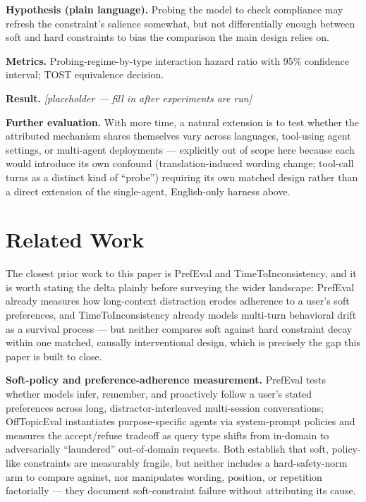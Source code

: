 \documentclass[11pt]{article}
\newcommand{\ph}{\textit{[placeholder --- fill in after experiments are run]}}
\begin{document}
\textbf{Hypothesis (plain language).} Probing the model to check compliance may refresh the constraint's salience somewhat, but not differentially enough between soft and hard constraints to bias the comparison the main design relies on.

\textbf{Metrics.} Probing-regime-by-type interaction hazard ratio with 95\% confidence interval; TOST equivalence decision.

\textbf{Result.} \ph

\vspace{0.5em}
\noindent\textbf{Further evaluation.} With more time, a natural extension is to test whether the attributed mechanism shares themselves vary across languages, tool-using agent settings, or multi-agent deployments --- explicitly out of scope here because each would introduce its own confound (translation-induced wording change; tool-call turns as a distinct kind of ``probe'') requiring its own matched design rather than a direct extension of the single-agent, English-only harness above.

\section{Related Work}

The closest prior work to this paper is PrefEval and TimeToInconsistency, and it is worth stating the delta plainly before surveying the wider landscape: PrefEval already measures how long-context distraction erodes adherence to a user's soft preferences, and TimeToInconsistency already models multi-turn behavioral drift as a survival process --- but neither compares soft against hard constraint decay within one matched, causally interventional design, which is precisely the gap this paper is built to close.

\textbf{Soft-policy and preference-adherence measurement.} PrefEval tests whether models infer, remember, and proactively follow a user's stated preferences across long, distractor-interleaved multi-session conversations; OffTopicEval instantiates purpose-specific agents via system-prompt policies and measures the accept/refuse tradeoff as query type shifts from in-domain to adversarially ``laundered'' out-of-domain requests. Both establish that soft, policy-like constraints are measurably fragile, but neither includes a hard-safety-norm arm to compare against, nor manipulates wording, position, or repetition factorially --- they document soft-constraint failure without attributing its cause.
\end{document}
